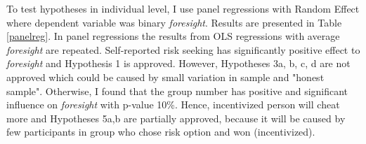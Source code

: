 \documentclass[12pt]{article}
\begin{document}
	To test hypotheses in individual level, I use panel regressions with Random Effect where dependent variable was binary \textit{foresight}. Results are presented in Table \ref{panelreg}. In panel regressions the results from OLS regressions with average \textit{foresight} are repeated. Self-reported risk seeking has significantly positive effect to \textit{foresight} and Hypothesis 1 is approved. However, Hypotheses 3a, b, c, d are not approved which could be caused by small variation in sample and "honest sample". Otherwise, I found that the group number has positive and significant influence on \textit{foresight} with p-value 10\%. Hence, incentivized person will cheat more and Hypotheses 5a,b  are partially approved, because it will be caused by few participants in group who chose risk option and won (incentivized).
\end{document}
